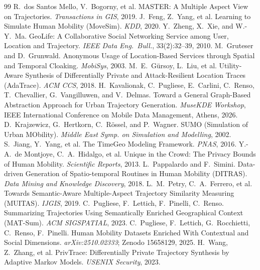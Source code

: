 \documentclass[sigconf,nonacm]{acmart}
\begin{document}
\begin{thebibliography}{99}
 R.~dos Santos Mello, V.~Bogorny, et al. MASTER: A Multiple Aspect View on Trajectories. \emph{Transactions in GIS}, 2019.
 J.~Feng, Z.~Yang, et al. Learning to Simulate Human Mobility (MoveSim). \emph{KDD}, 2020.
 Y.~Zheng, X.~Xie, and W.-Y.~Ma. GeoLife: A Collaborative Social Networking Service
among User, Location and Trajectory. \emph{IEEE Data Eng.\ Bull.}, 33(2):32--39, 2010.
 M.~Gruteser and D.~Grunwald. Anonymous Usage of Location-Based Services through Spatial and Temporal Cloaking. \emph{MobiSys}, 2003.
 M.~E.~G\"ursoy, L.~Liu, et al. Utility-Aware Synthesis of Differentially Private and Attack-Resilient Location Traces (AdaTrace). \emph{ACM CCS}, 2018.
 H.~Kavalionak, C.~Pugliese, E.~Carlini, C.~Renso,
T.~Chevallier, G.~Vangilluwen, and V.~Delmas. Toward a General Graph-Based Abstraction
Approach for Urban Trajectory Generation. \emph{MuseKDE Workshop}, IEEE International Conference on Mobile Data Management, Athens, 2026.
 D.~Krajzewicz, G.~Hertkorn, C.~R\"ossel, and P.~Wagner. SUMO
(Simulation of Urban MObility). \emph{Middle East Symp. on Simulation and Modelling}, 2002.
 S.~Jiang, Y.~Yang, et al. The TimeGeo Modeling Framework. \emph{PNAS}, 2016.
 Y.-A.~de Montjoye, C.~A.~Hidalgo, et al. Unique in the Crowd: The Privacy Bounds of Human Mobility. \emph{Scientific Reports}, 2013.
 L.~Pappalardo and F.~Simini. Data-driven Generation of Spatio-temporal Routines in Human Mobility (DITRAS). \emph{Data Mining and Knowledge Discovery}, 2018.
 L.~M.~Petry, C.~A.~Ferrero, et al. Towards Semantic-Aware Multiple-Aspect Trajectory Similarity Measuring (MUITAS). \emph{IJGIS}, 2019.
 C.~Pugliese, F.~Lettich, F.~Pinelli, C.~Renso. Summarizing Trajectories Using Semantically Enriched Geographical Context (MAT-Sum). \emph{ACM SIGSPATIAL}, 2023.
 C.~Pugliese, F.~Lettich, G.~Rocchietti, C.~Renso, F.~Pinelli. Human Mobility Datasets Enriched With Contextual and Social Dimensions. \emph{arXiv:2510.02333}; Zenodo 15658129, 2025.
 H.~Wang, Z.~Zhang, et al. PrivTrace: Differentially Private Trajectory Synthesis by Adaptive Markov Models. \emph{USENIX Security}, 2023.

\end{thebibliography}
\end{document}
